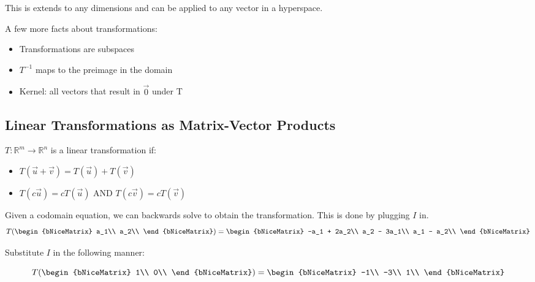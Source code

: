 This is extends to any dimensions and can be applied to any vector in a hyperspace.

A few more facts about transformations:
\begin{itemize}
	\item Transformations are subspaces
	\item $T^{-1}$ maps to the preimage in the domain
	\item Kernel: all vectors that result in $\vec{0}$ under T
\end{itemize}

\subsection{Linear Transformations as Matrix-Vector Products}\label{concept3.4}

$T:\mathbb{R}^m \rightarrow \mathbb{R}^n$ is a linear transformation if:
\begin{itemize}
	\item $T(\vec{u} + \vec{v}) = T(\vec{u}) + T(\vec{v})$
	\item $T(c\vec{u}) = cT(\vec{u})$ AND $T(c\vec{v}) = cT(\vec{v})$
\end{itemize}

Given a codomain equation, we can backwards solve to obtain the transformation. This is done by plugging $I$ in.
\\

\begin{equation}
	T(
	\begin{bNiceMatrix}
		a_1\\
		a_2\\
	\end{bNiceMatrix}
	)
	=
	\begin{bNiceMatrix}
		-a_1 + 2a_2\\
		a_2 - 3a_1\\
		a_1 - a_2\\
	\end{bNiceMatrix}
\end{equation}

Substitute $I$ in the following manner:

\begin{equation}
	T(
	\begin{bNiceMatrix}
		1\\
		0\\
	\end{bNiceMatrix}
	)
	=
	\begin{bNiceMatrix}
		-1\\
		-3\\
		1\\
	\end{bNiceMatrix}
\end{equation}

